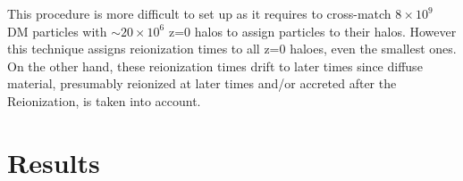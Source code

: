 \documentclass[twocolumn]{aastex61}
\begin{document}
This procedure is more difficult to set up as it requires to cross-match $8\times 10^9$ DM particles with $\sim 20\times 10^6$ z=0 halos  to assign particles to their halos. 
However this technique assigns reionization times to all z=0 haloes, even the smallest ones. On the other hand, these reionization times drift to later times since diffuse material, presumably reionized at later times and/or  accreted after the Reionization, is taken into account. 
 
% 
\section{Results}

%
%
%
%
\end{document}
